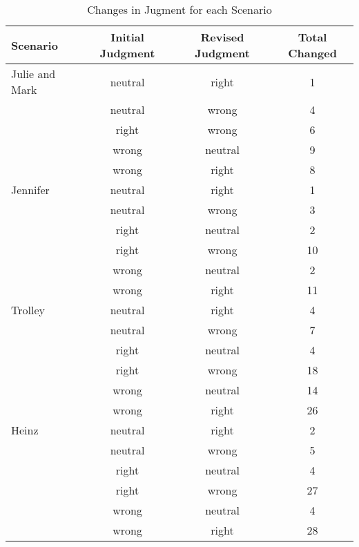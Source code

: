 \documentclass[
  american,
  man,floatsintext]{apa7}
\begin{document}
\begin{table}[tbp]

\begin{center}
\begin{threeparttable}

\caption{\label{tab:tabS6changeeachscenario}Changes in Jugment for each Scenario}

\begin{tabular}{lccc}
\toprule
Scenario & \multicolumn{1}{c}{Initial Judgment} & \multicolumn{1}{c}{Revised Judgment} & \multicolumn{1}{c}{Total Changed}\\
\midrule
Julie and Mark & neutral & right & 1\\
 & neutral & wrong & 4\\
 & right & wrong & 6\\
 & wrong & neutral & 9\\
 & wrong & right & 8\\
Jennifer & neutral & right & 1\\
 & neutral & wrong & 3\\
 & right & neutral & 2\\
 & right & wrong & 10\\
 & wrong & neutral & 2\\
 & wrong & right & 11\\
Trolley & neutral & right & 4\\
 & neutral & wrong & 7\\
 & right & neutral & 4\\
 & right & wrong & 18\\
 & wrong & neutral & 14\\
 & wrong & right & 26\\
Heinz & neutral & right & 2\\
 & neutral & wrong & 5\\
 & right & neutral & 4\\
 & right & wrong & 27\\
 & wrong & neutral & 4\\
 & wrong & right & 28\\
\bottomrule
\end{tabular}

\end{threeparttable}
\end{center}

\end{table}
\end{document}

